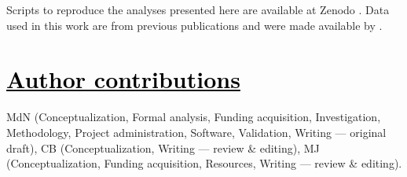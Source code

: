 \documentclass[a4paper]{article}
\begin{document}
Scripts to reproduce the analyses presented here are available at Zenodo \parencite{Navascues2023}. Data used in this work are from previous publications and were made available by \textcite{Bevan2017b}.
\\


\section*{\centering \href{https://credit.niso.org/}{\textcolor{black}{Author contributions}}}

MdN (Conceptualization, Formal analysis, Funding acquisition, Investigation, Methodology, Project administration, Software, Validation, Writing --- original draft), CB (Conceptualization, Writing --- review \& editing), MJ (Conceptualization, Funding acquisition, Resources, Writing --- review \& editing).
\\











\end{document}

